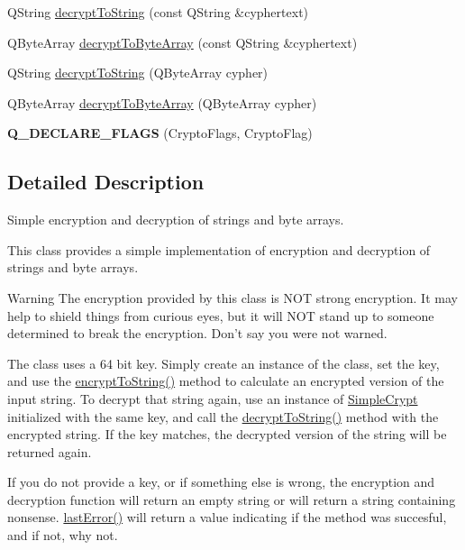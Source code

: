 \begin{DoxyCompactItemize}
\item 
Q\-String \hyperlink{class_simple_crypt_aa454cf372b534fd5ffaa2c5bd0fa57ea}{decrypt\-To\-String} (const Q\-String \&cyphertext)
\item 
Q\-Byte\-Array \hyperlink{class_simple_crypt_ad6785e087d449a1aa80c39248e98fcda}{decrypt\-To\-Byte\-Array} (const Q\-String \&cyphertext)
\item 
Q\-String \hyperlink{class_simple_crypt_ad1a3257cefee43773803ec1b12654f92}{decrypt\-To\-String} (Q\-Byte\-Array cypher)
\item 
Q\-Byte\-Array \hyperlink{class_simple_crypt_a4babb69e45849f672574a26b6433c85a}{decrypt\-To\-Byte\-Array} (Q\-Byte\-Array cypher)
\item 
\hypertarget{class_simple_crypt_a710fb3871372ccddd6450f73afca24eb}{{\bfseries Q\-\_\-\-D\-E\-C\-L\-A\-R\-E\-\_\-\-F\-L\-A\-G\-S} (Crypto\-Flags, Crypto\-Flag)}\label{class_simple_crypt_a710fb3871372ccddd6450f73afca24eb}

\end{DoxyCompactItemize}


\subsection{Detailed Description}
Simple encryption and decryption of strings and byte arrays. 

This class provides a simple implementation of encryption and decryption of strings and byte arrays.

\begin{DoxyWarning}{Warning}
The encryption provided by this class is N\-O\-T strong encryption. It may help to shield things from curious eyes, but it will N\-O\-T stand up to someone determined to break the encryption. Don't say you were not warned.
\end{DoxyWarning}
The class uses a 64 bit key. Simply create an instance of the class, set the key, and use the \hyperlink{class_simple_crypt_af26a3d3c6cef9732190c1d2c6a53a5b5}{encrypt\-To\-String()} method to calculate an encrypted version of the input string. To decrypt that string again, use an instance of \hyperlink{class_simple_crypt}{Simple\-Crypt} initialized with the same key, and call the \hyperlink{class_simple_crypt_aa454cf372b534fd5ffaa2c5bd0fa57ea}{decrypt\-To\-String()} method with the encrypted string. If the key matches, the decrypted version of the string will be returned again.

If you do not provide a key, or if something else is wrong, the encryption and decryption function will return an empty string or will return a string containing nonsense. \hyperlink{class_simple_crypt_a123562e29377ab26e3b398b588f596d9}{last\-Error()} will return a value indicating if the method was succesful, and if not, why not.

